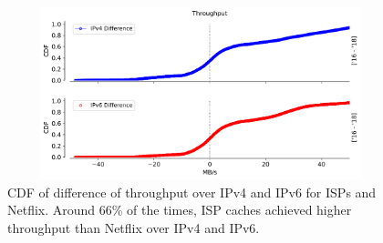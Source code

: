 \begin{figure}[!ht]
	\centering
	\includegraphics[keepaspectratio, height=5cm, width=15cm]{figures/cache/allisps/netlflix-throughput-difference-all-isps.pdf}
	\caption[All ISPs Throughput CDF Deltas]{CDF of difference of throughput over IPv4 and IPv6 for ISPs and Netflix. 
Around 66\% of the times, ISP caches achieved higher throughput than Netflix over IPv4 and IPv6.}
	\label{fig:All ISPs Throughput CDF Deltas}
\end{figure}

\FloatBarrier